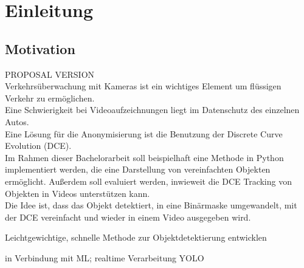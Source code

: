 \chapter{Einleitung}
\label{ch:intro}


\section{Motivation}{ PROPOSAL VERSION \\
	Verkehrsüberwachung mit Kameras ist ein wichtiges Element um flüssigen Verkehr zu ermöglichen. \\
	Eine Schwierigkeit bei Videoaufzeichnungen liegt im Datenschutz des einzelnen Autos.  \\
	Eine Lösung für die Anonymisierung ist die Benutzung der Discrete Curve Evolution (DCE).\\
	Im Rahmen dieser Bachelorarbeit soll beispielhaft eine Methode in Python implementiert werden, die eine Darstellung von vereinfachten Objekten ermöglicht. Außerdem soll evaluiert werden, inwieweit die DCE Tracking von Objekten in Videos unterstützen kann. \\
	Die Idee ist, dass das Objekt detektiert, in eine Binärmaske umgewandelt, mit der DCE vereinfacht und wieder in einem Video ausgegeben wird.

	\begin{list}{-}{Notizen}
		\item Leichtgewichtige, schnelle Methode zur Objektdetektierung entwicklen
		\item in Verbindung mit ML; realtime Verarbeitung YOLO
	\end{list}
}

